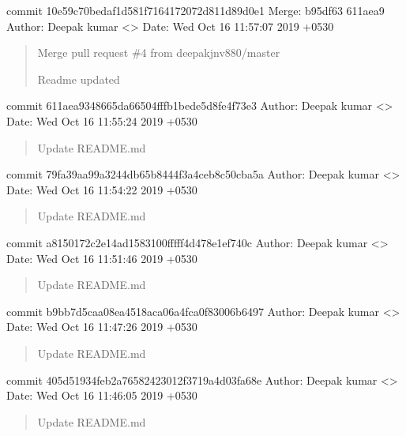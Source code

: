 \documentclass[letterpaper,10pt,english]{sphinxmanual}
\begin{document}
commit 10e59c70bedaf1d581f7164172072d811d89d0e1
Merge: b95df63 611aea9
Author: Deepak kumar \textless{}\textgreater{}
Date:   Wed Oct 16 11:57:07 2019 +0530
\begin{quote}

Merge pull request \#4 from deepakjnv880/master

Readme updated
\end{quote}

commit 611aea9348665da66504fffb1bede5d8fe4f73e3
Author: Deepak kumar \textless{}\textgreater{}
Date:   Wed Oct 16 11:55:24 2019 +0530
\begin{quote}

Update README.md
\end{quote}

commit 79fa39aa99a3244db65b8444f3a4ceb8c50cba5a
Author: Deepak kumar \textless{}\textgreater{}
Date:   Wed Oct 16 11:54:22 2019 +0530
\begin{quote}

Update README.md
\end{quote}

commit a8150172c2e14ad1583100fffff4d478e1ef740c
Author: Deepak kumar \textless{}\textgreater{}
Date:   Wed Oct 16 11:51:46 2019 +0530
\begin{quote}

Update README.md
\end{quote}

commit b9bb7d5caa08ea4518aca06a4fca0f83006b6497
Author: Deepak kumar \textless{}\textgreater{}
Date:   Wed Oct 16 11:47:26 2019 +0530
\begin{quote}

Update README.md
\end{quote}

commit 405d51934feb2a76582423012f3719a4d03fa68e
Author: Deepak kumar \textless{}\textgreater{}
Date:   Wed Oct 16 11:46:05 2019 +0530
\begin{quote}

Update README.md
\end{quote}
\end{document}
